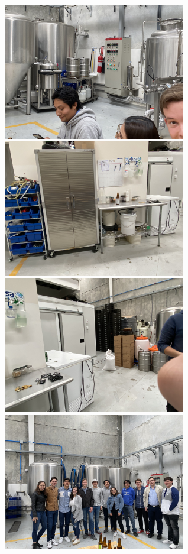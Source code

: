 \documentclass{article}
\begin{document}
\begin{figure}[htbp]
    \includegraphics[width=8cm]{./img/IMG-7094.JPG}
    \includegraphics[width=8cm]{./img/IMG-7095.JPG}
    \includegraphics[width=8cm]{./img/IMG-7096.JPG}
    \includegraphics[width=8cm]{./img/IMG-7097.JPG}

\end{figure}
\end{document}
